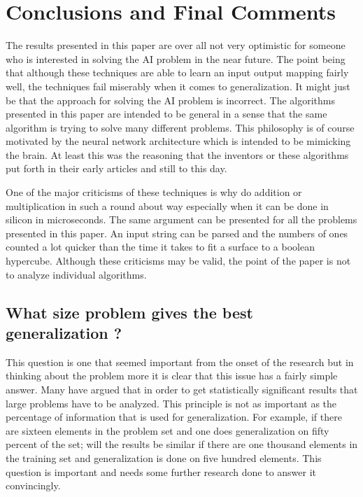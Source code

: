 \parskip 0.20in
\textheight 8.75in
\textwidth 6.0in
\topmargin -0.25in
\oddsidemargin 0.40in


\baselineskip 0.30in

\setcounter{chapter}{6}
\setcounter{page}{40}

\chapter{Conclusions and Final Comments}	

	The results presented in this paper are over all not very
optimistic for someone who is interested in solving the AI problem in
the near future.  The point being that although these techniques are
able to learn an input output mapping fairly well, the techniques fail
miserably when it comes to generalization.  It might just be that the
approach for solving the AI problem is incorrect.  The algorithms
presented in this paper are intended to be general in a sense that the
same algorithm is trying to solve many different problems.  This
philosophy is of course motivated by the neural network architecture
which is intended to be mimicking the brain.  At least this was the
reasoning that the inventors or these algorithms put forth in their
early articles and still to this day.

	One of the major criticisms of these techniques is why do
addition or multiplication in such a round about way especially when
it can be done in silicon in microseconds.  The same argument can be
presented for all the problems presented in this paper.  An input
string can be parsed and the numbers of ones counted a lot quicker
than the time it takes to fit a surface to a boolean hypercube.
Although these criticisms may be valid, the point of the paper is not
to analyze individual algorithms.

\section{What size problem gives the best generalization ?}

	This question is one that seemed important from the onset of
the research but in thinking about the problem more it is clear that
this issue has a fairly simple answer.  Many have argued that in order
to get statistically significant results that large problems have to
be analyzed.  This principle is not as important as the percentage of
information that is used for generalization.  For example, if there
are sixteen elements in the problem set and one does generalization on
fifty percent of the set; will the results be similar if there are one
thousand elements in the training set and generalization is done on
five hundred elements.  This question is important and needs some
further research done to answer it convincingly.

